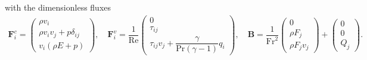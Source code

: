 	with the dimensionless fluxes
	\begin{align}
		\mathbf{F}_i^c = 
		\begin{pmatrix}
			\rho v_i \\
			\rho v_i v_j + p \delta_{ij}\\
			v_i(\rho E + p)
		\end{pmatrix} , \quad
		\mathbf{F}_i^v = \dfrac{1}{\text{Re}}
		\begin{pmatrix}
			0 \\
			\tau_{ij}\\
			\tau_{ij}v_j + \dfrac{\gamma}{\text{Pr}(\gamma-1)} q_i
		\end{pmatrix} , \quad
		\mathbf{B} = \dfrac{1}{\text{Fr}^2}
		\begin{pmatrix}
			0 \\
			\rho F_j\\
			\rho F_j v_j
		\end{pmatrix}
		+ 
		\begin{pmatrix}
			0 \\
			0\\
			Q_j
		\end{pmatrix}
		.
	\end{align}	
	